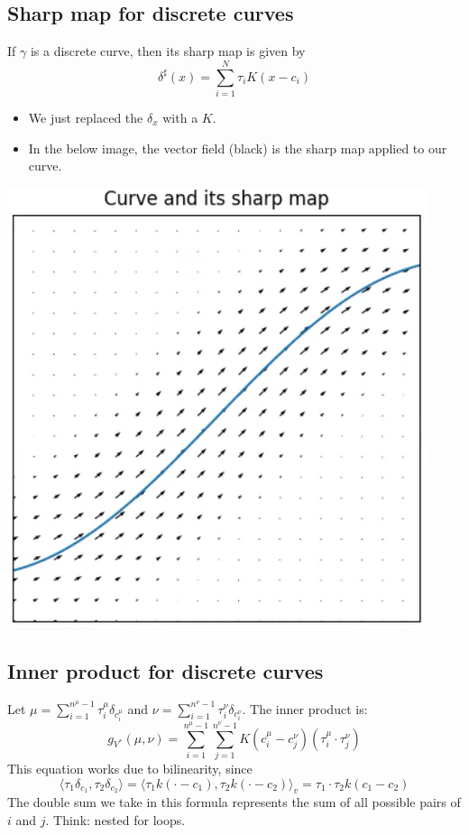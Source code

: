 \documentclass[10pt]{article}
\begin{document}
\subsection*{Sharp map for discrete curves}
If $\gamma$ is a discrete curve, then its sharp map is given by
\[\delta^\sharp(x) = \sum_{i = 1}^N \tau_i K(x - c_i)\]
\begin{itemize}
    \item We just replaced the $\delta_x$ with a $K$.
    \item In the below image, the vector field (black) is the sharp map applied to our curve.
\end{itemize}
\begin{center}
    \includegraphics*[scale=0.7]{W4_1.png}
\end{center}


\subsection*{Inner product for discrete curves}
Let $\mu = \sum_{i = 1}^{n^{\mu} - 1} \tau_i^\mu \delta_{c_i^\mu}$ and $\nu = \sum_{i = 1}^{n^\nu - 1} \tau_i^\nu \delta_{c_i^\nu}$.  The inner product is:
\[g_{V^*} (\mu, \nu) = \sum_{i = 1}^{n^\mu - 1} \sum_{j = 1}^{n^\nu - 1} K(c_i^\mu - c_j^\nu)(\tau_i^\mu \cdot \tau_j^\nu)\]
This equation works due to bilinearity, since
\[\langle\tau_1 \delta_{c_1}, \tau_2\delta_{c_2}\rangle = \langle \tau_1 k(\cdot - c_1), \tau_2 k(\cdot - c_2) \rangle_v = \tau_1 \cdot \tau_2 k(c_1 - c_2)\] 
The double sum we take in this formula represents the sum of all possible pairs of $i$ and $j$.  Think: nested for loops.
\end{document}
